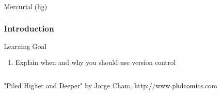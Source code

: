 \documentclass[xcolor=dvipsnames]{beamer}
\begin{document}
\begin{frame}
\begin{center}{\Huge Mercurial (hg)}
\end{center}
\end{frame}

\begin{frame}
\frametitle{Introduction}
Learning Goal
\begin{enumerate}

 \item   Explain when and why you should use version control

\end{enumerate}
\end{frame}

\begin{frame}
\begin{columns}
"Piled Higher and Deeper" by Jorge Cham, http://www.phdcomics.com
\end{columns}
\end{frame}
\end{document}

